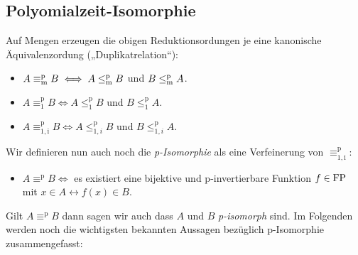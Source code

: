 \subsection*{Polyomialzeit-Isomorphie}
Auf Mengen erzeugen die obigen Reduktionsordungen je eine kanonische Äquivalenzordung („Duplikatrelation“):
\begin{itemize}
    \item $A\equiv_\mathrm{m}^\mathrm{p} B \iff A\leq_\mathrm{m}^\mathrm{p} B$ und $B\leq_\mathrm{m}^\mathrm{p} A$.
    \item $A\equiv_\mathrm{1}^\mathrm{p} B \iff A\leq_1^\mathrm{p} B$ und $B\leq_1^\mathrm{p} A$.
    \item $A\equiv_\mathrm{1,i}^\mathrm{p} B \iff A\leq_{1,i}^\mathrm{p} B$ und $B\leq_{1,i}^\mathrm{p} A$.
\end{itemize}
Wir definieren nun auch noch die \emph{p-Isomorphie} als eine Verfeinerung von $\equiv_\mathrm{1,i}^\mathrm{p}$:
\begin{itemize}
    \item $A\equiv^\mathrm{p} B \iff$ es existiert eine bijektive und p-invertierbare Funktion $f\in\mathrm{FP}$ mit $x\in A\leftrightarrow f(x)\in B$.
\end{itemize}
Gilt $A\equiv^\mathrm{p} B$ dann sagen wir auch dass $A$ und $B$ \emph{p-isomorph} sind.
Im Folgenden werden noch die wichtigsten bekannten Aussagen bezüglich p-Isomorphie zusammengefasst:

